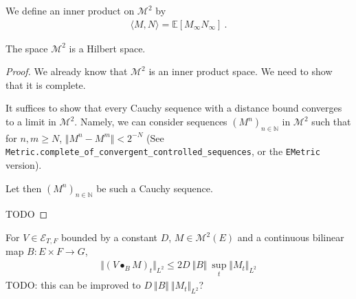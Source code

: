 \begin{definition}\label{def:L2Martingales.inner}
We define an inner product on $\mathcal{M}^2$ by
\begin{align*}
  \langle M, N \rangle = \mathbb{E}[M_\infty N_\infty]
  \: .
\end{align*}
\end{definition}


\begin{theorem}\label{thm:hilbertSpace_L2Martingales}
The space $\mathcal{M}^2$ is a Hilbert space.
\end{theorem}

\begin{proof}
We already know that $\mathcal{M}^2$ is an inner product space.
We need to show that it is complete.

It suffices to show that every Cauchy sequence with a distance bound converges to a limit in $\mathcal{M}^2$.
Namely, we can consider sequences $(M^n)_{n \in \mathbb{N}}$ in $\mathcal{M}^2$ such that for $n, m \ge N$, $\Vert M^n - M^m \Vert < 2^{-N}$ (See \texttt{Metric.complete\_of\_convergent\_controlled\_sequences}, or the \texttt{EMetric} version).

Let then $(M^n)_{n \in \mathbb{N}}$ be such a Cauchy sequence.

TODO
\end{proof}


\begin{lemma}\label{lem:eLpNorm_elemStochIntegralBilin_le}
For $V \in \mathcal{E}_{T, F}$ bounded by a constant $D$, $M \in \mathcal{M}^2(E)$ and a continuous bilinear map $B: E \times F \to G$,
\begin{align*}
  \Vert (V \bullet_B M)_t \Vert_{L^2}
  \le 2 D \: \Vert B \Vert \: \sup_t \Vert M_t \Vert_{L^2}
\end{align*}
TODO: this can be improved to $D \: \Vert B \Vert \: \Vert M_t \Vert_{L^2}$?
\end{lemma}

